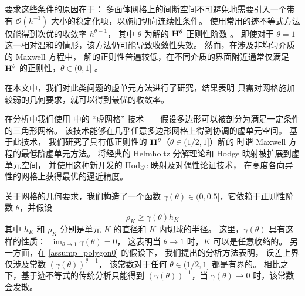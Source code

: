 要求这些条件的原因在于：
多面体网格上的间断空间不可避免地需要引入一个带有 $\mathcal{O}(h^{-1})$ 
大小的稳定化项，以施加切向连续性条件。
使用常用的迹不等式方法仅能得到次优的收敛率 $h^{\theta-1}$，
其中 $\theta$ 为解的 $\mathbf{H}^{\theta}$ 正则性阶数 \cite{2016CasagrandeWinkelmannHiptmairOstrowski,2016CasagrandeHiptmairOstrowski}。
即使对于 $\theta=1$ 这一相对温和的情形，该方法仍可能导致收敛性失效。
然而，在涉及非均匀介质的 Maxwell 方程中，
解的正则性普遍较低，在不同介质的界面附近通常仅满足 $\mathbf{H}^{\theta}$ 的正则性，$\theta\in(0,1]$ \cite{2016Ciarlet,2004CostabelDaugeNicaise,2018Alberti,1999MartinMoniqueSerge,2000CostabelDauge}。


在本文中，我们对此类问题的虚单元方法进行了研究，结果表明
只需对网格施加较弱的几何要求，就可以得到最优的收敛率。

在分析中我们使用 \cite{2021CaoChenGuo} 中的 “虚网格”
技术——假设多边形可以被剖分为满足一定条件的三角形网格。
该技术能够在几乎任意多边形网格上得到协调的虚单元空间。
基于此技术，
我们研究了具有低正则性的 $\mathbf{H}^{\theta}$（$\theta \in (1/2,1]$）解的
时谐 Maxwell 方程的最低阶虚单元方法。
将经典的 Helmholtz 分解理论和 Hodge 映射被扩展到虚单元空间，
并使用这种新开发的 Hodge 映射及对偶性论证技术，
在高度各向异性的网格上获得最优的逼近精度。

关于网格的几何要求，我们构造了一个函数 $\gamma(\theta) \in
(0,0.5]$，它依赖于正则性阶数 $\theta$，并假设
\begin{equation}
\label{assump_polygon0}
\rho_K \ge \gamma(\theta) h_K
\end{equation}
其中 $h_K$ 和 $\rho_K$ 分别是单元 $K$ 的直径和 $K$ 内切球的半径。
这里，$\gamma(\theta)$ 具有这样的性质：%
$\lim_{\theta\rightarrow 1}\gamma(\theta) = 0$，
这表明当 $\theta \rightarrow 1$ 时，$K$ 可以是任意收缩的。
另一方面，在 \eqref{assump_polygon0} 的假设下，
我们提出的分析方法表明，
误差上界仅涉及常数 $(\gamma(\theta))^{\theta-1}$，
该常数对于任何 $\theta \in (1/2,1]$ 都是有界的。
相比之下，基于迹不等式的传统分析只能得到 
$(\gamma(\theta))^{-1}$，当 $\gamma(\theta) \rightarrow 0$ 时，该常数会发散。

